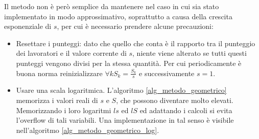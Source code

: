 Il metodo non è però semplice da mantenere nel caso in cui sia stato implementato in modo approssimativo, soprattutto a causa della crescita esponenziale di $s$, per cui è necessario prendere alcune precauzioni:
\begin{itemize}
    \item Resettare i punteggi: dato che quello che conta è il rapporto tra il punteggio dei lavoratori e il valore corrente di $s$, niente viene alterato se tutti questi punteggi vengono divisi per la stessa quantità. Per cui periodicamente è buona norma reinizializzare $\forall k S_k = \frac{S_k}{s}$ e successivamente $s=1$.
    \item Usare una scala logaritmica. L'algoritmo \ref{alg_metodo_geometrico} memorizza i valori reali di $s$ e $S$, che possono diventare molto elevati. Memorizzando i loro logaritmi $ls$ ed $lS$ ed adattando i calcoli si evita l'overflow di tali variabili. Una implementazione in tal senso è visibile nell'algoritmo \ref{alg_metodo_geometrico_log}.
\end{itemize}


